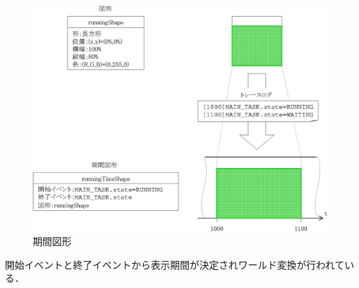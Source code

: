 \begin{figure}[p]
\begin{center}
\includegraphics{img/timeShape.eps}
\caption{期間図形}
\label{fig:timeShape}
\end{center}
\end{figure}

開始イベントと終了イベントから表示期間が決定されワールド変換が行われている．
